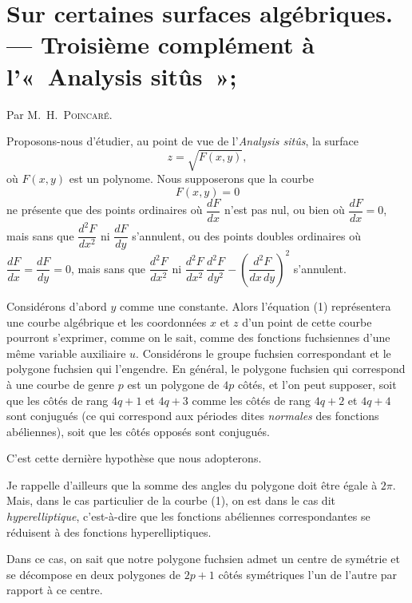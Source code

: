 \documentclass{article}
\begin{document}

\section*{Sur certaines surfaces algébriques. --- Troisième complément à l'«~Analysis sitûs~»;}

Par M.~H.~\textsc{Poincaré}.

Proposons-nous d'étudier, au point de vue de l'\emph{Analysis sitûs}, la surface
\[ z = \sqrt{F(x, y)}, \tag{1} \]
où $F(x, y)$ est un polynome. Nous supposerons que la courbe
\[ F(x, y) = 0 \]
ne présente que des points ordinaires où $\dfrac{dF}{dx}$ n'est pas nul, ou bien où $\dfrac{dF}{dx} = 0$, mais sans que $\dfrac{d^{2}F}{dx^{2}}$ ni $\dfrac{dF}{dy}$ s'annulent, ou des points doubles ordinaires où $\dfrac{dF}{dx} = \dfrac{dF}{dy} = 0$, mais sans que $\dfrac{d^{2}F}{dx^{2}}$ ni $\dfrac{d^{2}F}{dx^{2}}\,\dfrac{d^{2}F}{dy^{2}} - \left(\dfrac{d^{2}F}{dx\,dy}\right)^{2}$ s'annulent.

Considérons d'abord $y$ comme une constante. Alors l'équation (1) représentera une courbe algébrique et les coordonnées $x$ et $z$ d'un point de cette courbe pourront s'exprimer, comme on le sait, comme des fonctions fuchsiennes d'une même variable auxiliaire $u$. Considérons le groupe fuchsien correspondant et le polygone fuchsien qui l'engendre. En général, le polygone fuchsien qui correspond à une courbe de genre $p$ est un polygone de $4p$ côtés, et l'on peut supposer, soit que les côtés de rang $4q + 1$ et $4q + 3$ comme les côtés de rang $4q + 2$ et $4q + 4$ sont conjugués (ce qui correspond aux périodes dites \emph{normales} des fonctions abéliennes), soit que les côtés opposés sont conjugués.

C'est cette dernière hypothèse que nous adopterons.

Je rappelle d'ailleurs que la somme des angles du polygone doit être égale à $2\pi$. Mais, dans le cas particulier de la courbe (1), on est dans le cas dit \emph{hyperelliptique}, c'est-à-dire que les fonctions abéliennes correspondantes se réduisent à des fonctions hyperelliptiques.


Dans ce cas, on sait que notre polygone fuchsien admet un centre de symétrie et se décompose en deux polygones de $2p + 1$ côtés symétriques l'un de l'autre par rapport à ce centre.
\end{document}
